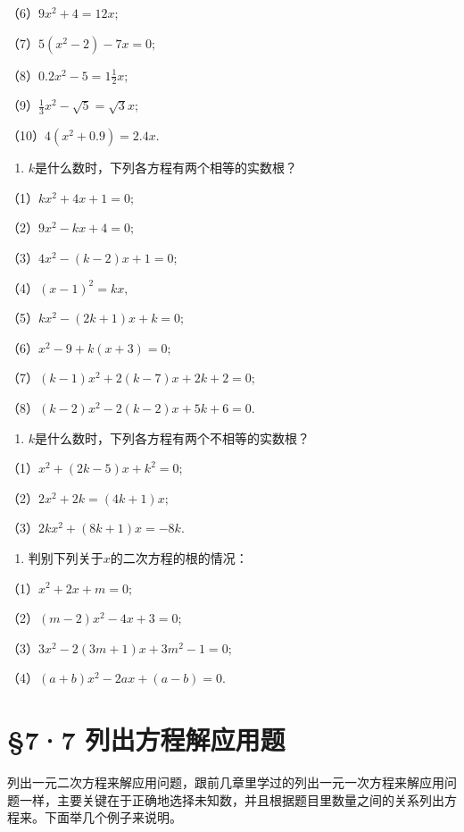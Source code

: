 （6）\(9x^{2} + 4 = 12x;\)

（7）\(5(x^{2} - 2) - 7x = 0;\)

（8）\(0.2x^{2} - 5 = 1\frac{1}{2} x;\)

（9）\(\frac{1}{3} x^2 - \sqrt{5} = \sqrt{3} x;\)

（10）\(4(x^{2} + 0.9) = 2.4x.\)

\begin{enumerate}[start=2]
\item
  \(k\)是什么数时，下列各方程有两个相等的实数根？
\end{enumerate}

（1）\(kx^{2} + 4x + 1 = 0;\)

（2）\(9x^{2} - kx + 4 = 0;\)

（3）\(4x^{2} - (k - 2)x + 1 = 0;\)

（4）\((x - 1)^{2} = kx,\)

（5）\(kx^{2} - (2k + 1)x + k = 0;\)

（6）\(x^{2} - 9 + k(x + 3) = 0;\)

（7）\((k - 1)x^{2} + 2(k - 7)x + 2k + 2 = 0;\)

（8）\((k - 2)x^{2} - 2(k - 2)x + 5k + 6 = 0.\)

\begin{enumerate}[start=3]
\item
  \(k\)是什么数时，下列各方程有两个不相等的实数根？
\end{enumerate}

（1）\(x^{2} + (2k - 5)x + k^{2} = 0;\)

（2）\(2x^{2} + 2k = (4k + 1)x;\)

（3）\(2k x^{2} + (8k + 1)x = -8k.\)

\begin{enumerate}[start=4]
\item
  判别下列关于\(x\)的二次方程的根的情况：
\end{enumerate}

（1）\(x^{2} + 2x + m = 0;\)

（2）\((m - 2)x^{2} - 4x + 3 = 0;\)

（3）\(3x^{2} - 2(3m + 1)x + 3m^{2} - 1 = 0;\)

（4）\((a + b)x^{2} - 2ax + (a - b) = 0.\)

\section{§7·7 列出方程解应用题}

列出一元二次方程来解应用问题，跟前几章里学过的列出一元一次方程来解应用问题一样，主要关键在于正确地选择未知数，并且根据题目里数量之间的关系列出方程来。下面举几个例子来说明。

